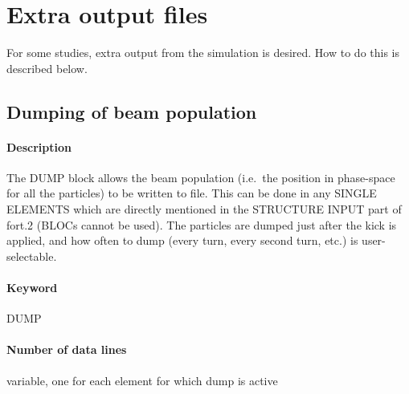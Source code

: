 \documentclass[a4paper,11pt]{report}
\begin{document}
\section{Extra output files}
For some studies, extra output from the simulation is desired.
How to do this is described below.

\subsection{Dumping of beam population} \label{sec:DUMP}

\paragraph{Description}
The DUMP block allows the beam population (i.e.\ the position in phase-space for all the particles) to be written to file.
This can be done in any SINGLE ELEMENTS which are directly mentioned in the STRUCTURE INPUT part of fort.2 (BLOCs cannot be used).
The particles are dumped just after the kick is applied, and how often to dump (every turn, every second turn, etc.) is user-selectable.

\paragraph{Keyword}
DUMP

\paragraph{Number of data lines}
variable, one for each element for which dump is active
\end{document}
